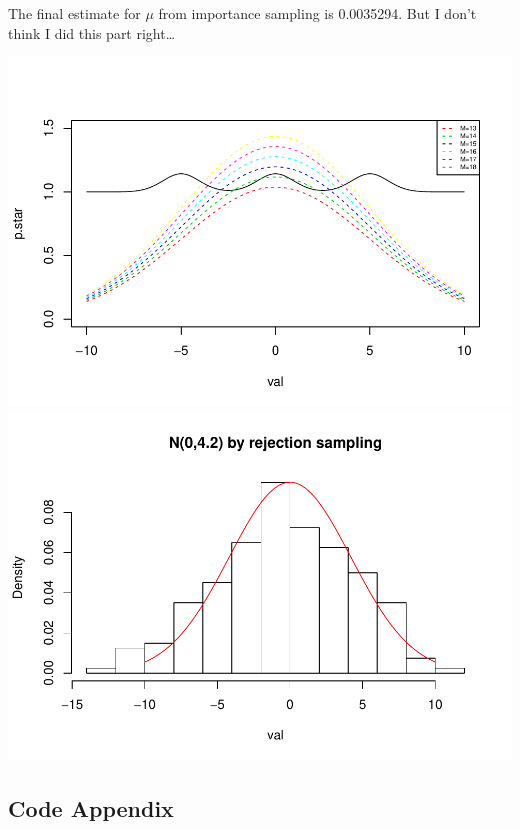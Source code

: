 \documentclass[
]{article}
\begin{document}
The final estimate for \(\mu\) from importance sampling is 0.0035294.
But I don't think I did this part right\ldots{}

\includegraphics{hw2_files/figure-latex/unnamed-chunk-8-1.pdf}
\includegraphics{hw2_files/figure-latex/unnamed-chunk-8-2.pdf}

\hypertarget{code-appendix}{%
\subsection{Code Appendix}\label{code-appendix}}
\end{document}
